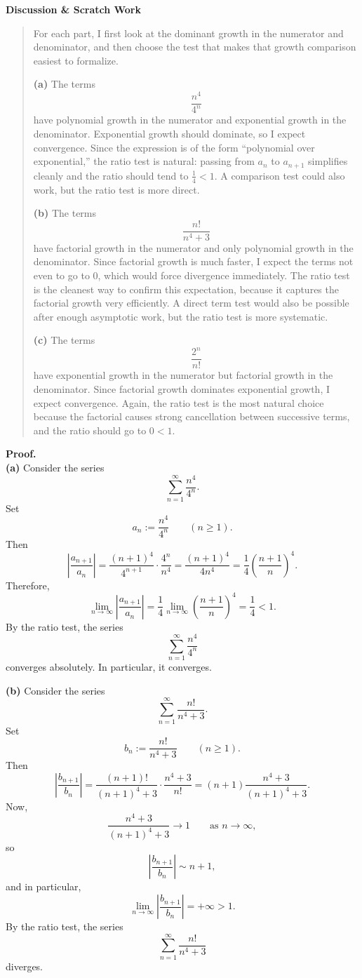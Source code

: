 \documentclass[12pt]{article}
\newenvironment{scratch}{%
  \par\smallskip
  \noindent\textbf{Discussion \& Scratch Work}\begin{quote}\small
}{%
  \end{quote}\smallskip
}
\begin{document}
\begin{scratch}
For each part, I first look at the dominant growth in the numerator and denominator, and then choose the test that makes that growth comparison easiest to formalize.

\textbf{(a)} The terms
\[
\frac{n^4}{4^n}
\]
have polynomial growth in the numerator and exponential growth in the denominator. Exponential growth should dominate, so I expect convergence. Since the expression is of the form ``polynomial over exponential,'' the ratio test is natural: passing from $a_n$ to $a_{n+1}$ simplifies cleanly and the ratio should tend to $\frac14<1$. A comparison test could also work, but the ratio test is more direct.

\textbf{(b)} The terms
\[
\frac{n!}{n^4+3}
\]
have factorial growth in the numerator and only polynomial growth in the denominator. Since factorial growth is much faster, I expect the terms not even to go to $0$, which would force divergence immediately. The ratio test is the cleanest way to confirm this expectation, because it captures the factorial growth very efficiently. A direct term test would also be possible after enough asymptotic work, but the ratio test is more systematic.

\textbf{(c)} The terms
\[
\frac{2^n}{n!}
\]
have exponential growth in the numerator but factorial growth in the denominator. Since factorial growth dominates exponential growth, I expect convergence. Again, the ratio test is the most natural choice because the factorial causes strong cancellation between successive terms, and the ratio should go to $0<1$.
\end{scratch}

\textbf{Proof.}\\
\textbf{(a)} Consider the series
\[
\sum_{n=1}^{\infty} \frac{n^4}{4^n}.
\]
Set
\[
a_n := \frac{n^4}{4^n} \qquad (n\ge 1).
\]
Then
\[
\left|\frac{a_{n+1}}{a_n}\right|
= \frac{(n+1)^4}{4^{n+1}}\cdot \frac{4^n}{n^4}
= \frac{(n+1)^4}{4n^4}
= \frac{1}{4}\left(\frac{n+1}{n}\right)^4.
\]
Therefore,
\[
\lim_{n\to\infty} \left|\frac{a_{n+1}}{a_n}\right|
= \frac{1}{4}\lim_{n\to\infty}\left(\frac{n+1}{n}\right)^4
= \frac{1}{4}<1.
\]
By the ratio test, the series
\[
\sum_{n=1}^{\infty} \frac{n^4}{4^n}
\]
converges absolutely. In particular, it converges.

\textbf{(b)} Consider the series
\[
\sum_{n=1}^{\infty} \frac{n!}{n^4+3}.
\]
Set
\[
b_n := \frac{n!}{n^4+3} \qquad (n\ge 1).
\]
Then
\[
\left|\frac{b_{n+1}}{b_n}\right|
= \frac{(n+1)!}{(n+1)^4+3}\cdot \frac{n^4+3}{n!}
= (n+1)\frac{n^4+3}{(n+1)^4+3}.
\]
Now,
\[
\frac{n^4+3}{(n+1)^4+3}
\to 1
\qquad \text{as } n\to\infty,
\]
so
\[
\left|\frac{b_{n+1}}{b_n}\right| \sim n+1,
\]
and in particular,
\[
\lim_{n\to\infty} \left|\frac{b_{n+1}}{b_n}\right| = +\infty > 1.
\]
By the ratio test, the series
\[
\sum_{n=1}^{\infty} \frac{n!}{n^4+3}
\]
diverges.
\end{document}
